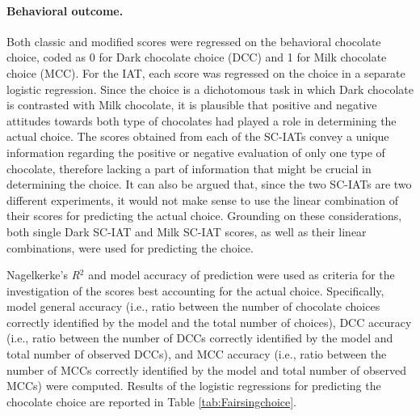 \documentclass[12pt]{book}
\begin{document}
\paragraph{Behavioral outcome.}

Both classic and modified scores were regressed on the behavioral chocolate choice, coded as 0 for Dark chocolate choice (DCC) and 1 for Milk chocolate choice (MCC). For the IAT, each score was regressed on the choice in a separate logistic regression. Since the choice is a dichotomous task in which Dark chocolate is contrasted with Milk chocolate, it is plausible that positive and negative attitudes towards both type of chocolates had played a role in determining the actual choice. The scores obtained from each of the SC-IATs convey a unique information regarding the positive or negative evaluation of only one type of chocolate, therefore lacking a part of information that might be crucial in determining the choice. It can also be argued that, since the two SC-IATs are two different experiments, it would not make sense to use the linear combination of their scores for predicting the actual choice. Grounding on these considerations, both single Dark SC-IAT and Milk SC-IAT scores, as well as their linear combinations, were used for predicting the choice.

Nagelkerke’s \emph{R}$^2$ \cite{nagel} and model accuracy of prediction \cite{faraway2006} were used as criteria for the investigation of the scores best accounting for the actual choice. Specifically, model general accuracy (i.e., ratio between the number of chocolate choices correctly identified by the model and the total number of choices), DCC accuracy (i.e., ratio between the number of DCCs correctly identified by the model and total number of observed DCCs), and MCC accuracy (i.e., ratio between the number of MCCs correctly identified by the model and total number of observed MCCs) were computed. Results of the logistic regressions for predicting the chocolate choice are reported in Table \ref{tab:Fairsingchoice}.
\end{document}
